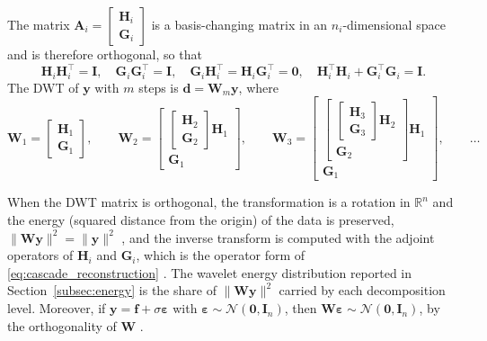 \begin{proposition}
\label{prop:dwt_orthogonal}
The matrix $\mathbf{A}_i = \begin{bmatrix}\mathbf{H}_i\\
\mathbf{G}_i\end{bmatrix}$ is a basis-changing matrix in an
$n_i$-dimensional space and is therefore orthogonal, so that
\begin{equation*}
\mathbf{H}_i\mathbf{H}_i^\top = \mathbf{I},\quad
\mathbf{G}_i\mathbf{G}_i^\top = \mathbf{I},\quad
\mathbf{G}_i\mathbf{H}_i^\top = \mathbf{H}_i\mathbf{G}_i^\top = \mathbf{0},
\quad\mathbf{H}_i^\top\mathbf{H}_i+\mathbf{G}_i^\top\mathbf{G}_i =
\mathbf{I}.
\end{equation*}
The DWT of $\mathbf{y}$ with $m$ steps is $\mathbf{d} =
\mathbf{W}_m\mathbf{y}$, where
\begin{equation}
\mathbf{W}_1 = \begin{bmatrix}\mathbf{H}_1\\ \mathbf{G}_1\end{bmatrix},\qquad
\mathbf{W}_2 = \begin{bmatrix}\begin{bmatrix}\mathbf{H}_2\\
\mathbf{G}_2\end{bmatrix}\mathbf{H}_1\\ \mathbf{G}_1\end{bmatrix},\qquad
\mathbf{W}_3 = \begin{bmatrix}\begin{bmatrix}\begin{bmatrix}\mathbf{H}_3\\
\mathbf{G}_3\end{bmatrix}\mathbf{H}_2\\ \mathbf{G}_2\end{bmatrix}\mathbf{H}_1\\
\mathbf{G}_1\end{bmatrix},\qquad\dots
\label{eq:dwt_matrix}
\end{equation}
\end{proposition}

When the DWT matrix is orthogonal, the transformation is a rotation in
$\mathbb{R}^n$ and the energy (squared distance from the origin) of the data
is preserved, $\|\mathbf{W}\mathbf{y}\|^2 = \|\mathbf{y}\|^2$
\cite[Sec.~4.1]{vidakovic1999}, and the inverse transform is computed with
the adjoint operators of $\mathbf{H}_i$ and $\mathbf{G}_i$, which is the
operator form of \eqref{eq:cascade_reconstruction}
\cite[Sec.~4.3]{vidakovic1999}. The wavelet energy distribution reported in
Section~\ref{subsec:energy} is the share of $\|\mathbf{W}\mathbf{y}\|^2$
carried by each decomposition level. Moreover, if $\mathbf{y} = \mathbf{f}+
\sigma\boldsymbol{\varepsilon}$ with $\boldsymbol{\varepsilon}\sim
\mathcal{N}(\mathbf{0},\mathbf{I}_n)$, then
$\mathbf{W}\boldsymbol{\varepsilon}\sim\mathcal{N}(\mathbf{0},\mathbf{I}_n)$,
by the orthogonality of $\mathbf{W}$ \cite[Sec.~6.1]{vidakovic1999}.

